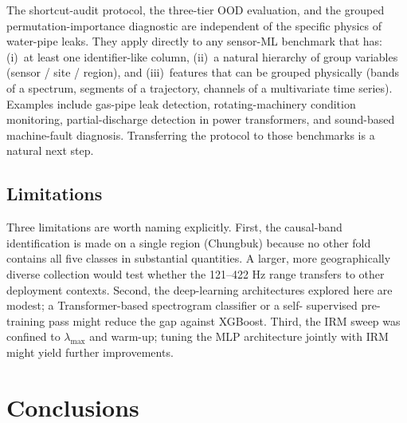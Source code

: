 \documentclass[sensors,article,submit,pdftex,oneauthor]{Definitions/mdpi}
\begin{document}
The shortcut-audit protocol, the three-tier OOD evaluation,
and the grouped permutation-importance diagnostic are
independent of the specific physics of water-pipe leaks.
They apply directly to any sensor-ML benchmark that has:
(i)~at least one identifier-like column, (ii)~a natural
hierarchy of group variables (sensor / site / region), and
(iii)~features that can be grouped physically (bands of a
spectrum, segments of a trajectory, channels of a
multivariate time series). Examples include gas-pipe leak
detection, rotating-machinery condition monitoring,
partial-discharge detection in power transformers, and
sound-based machine-fault diagnosis. Transferring the
protocol to those benchmarks is a natural next step.

\subsection{Limitations}

Three limitations are worth naming explicitly. First, the
causal-band identification is made on a single region (Chungbuk)
because no other fold contains all five classes in
substantial quantities. A larger, more geographically diverse
collection would test whether the 121--422 Hz range
transfers to other deployment contexts. Second, the
deep-learning architectures explored here are modest; a
Transformer-based spectrogram classifier or a self-
supervised pre-training pass might reduce the gap against
XGBoost. Third, the IRM sweep was confined to
$\lambda_{\max}$ and warm-up; tuning the MLP architecture
jointly with IRM might yield further improvements.

\section{Conclusions}\label{sec:conclusions}
\end{document}
